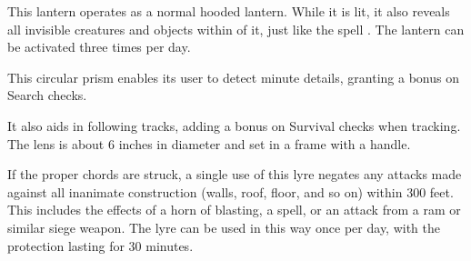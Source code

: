 {\begin{comment}
d\% & Contents & d\% & Contents \\
01?50 & Empty & 89 & Demon (glabrezu) \\
51?54 & Large air elemental & 90 & Demon (succubus) \\
55?58 & Arrowhawk & 91 & Devil (osyluth) \\
59?62 & Large earth elemental & 92 & Devil (barbazu) \\
63?66 & Xorn & 93 & Devil (erinyes) \\
67?70 & Large fire elemental & 94 & Devil (cornugon) \\
71?74 & Salamander & 95 & Celestial (avoral) \\
75?78 & Large water elemental & 96 & Celestial (ghaele) \\
79?82 & Adult tojanida & 97 & Formian myrmarch \\
83?84 & Chaos Beast & 98 & Arrowhawk, elder \\
85?86 & Formian taskmaster & 99 & Rakshasa \\
87 & Demon (vrock) & 100 & Demon (balor) or devil (pit fiend) - equal chance for either \\
88 & Demon (hezrou)  &   &   &

Strong conjuration; CL 20th; Craft Wondrous Item, trap the soul; Price 170,000 gp (empty);Weight 1 lb.
\end{comment}

 This lantern operates as a normal hooded lantern. While it is lit,  it also reveals all invisible creatures and objects within  of it, just like the spell . The lantern can be activated three times per day.


 This circular prism enables its user to detect minute details, granting a  bonus on Search checks.

It also aids in following tracks, adding a  bonus on Survival checks when tracking. The lens is about 6 inches in diameter and set in a frame with a handle.


 If the proper chords are struck, a single use of this lyre negates any attacks made against all inanimate construction (walls, roof, floor, and so on) within 300 feet. This includes the effects of a horn of blasting, a  spell, or an attack from a ram or similar siege weapon. The lyre can be used in this way once per day, with the protection lasting for 30 minutes.

}
